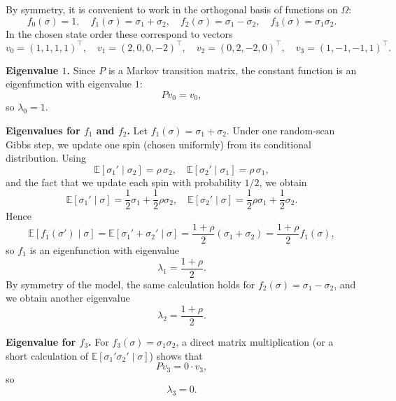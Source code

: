 \documentclass[answers,12pt,addpoints]{exam}
\begin{document}
\begin{enumerate}
\begin{solution}
By symmetry, it is convenient to work in the orthogonal basis of functions
on $\Omega$:
\[
f_0(\sigma) = 1,\quad
f_1(\sigma) = \sigma_1 + \sigma_2,\quad
f_2(\sigma) = \sigma_1 - \sigma_2,\quad
f_3(\sigma) = \sigma_1 \sigma_2.
\]
In the chosen state order these correspond to vectors
\[
v_0 = (1,1,1,1)^\top,\quad
v_1 = (2,0,0,-2)^\top,\quad
v_2 = (0,2,-2,0)^\top,\quad
v_3 = (1,-1,-1,1)^\top.
\]

\medskip
\noindent\textbf{Eigenvalue $1$.}
Since $P$ is a Markov transition matrix, the constant function is an
eigenfunction with eigenvalue $1$:
\[
P v_0 = v_0,
\]
so $\lambda_0 = 1$.

\medskip
\noindent\textbf{Eigenvalues for $f_1$ and $f_2$.}
Let $f_1(\sigma) = \sigma_1 + \sigma_2$. Under one random-scan Gibbs step,
we update one spin (chosen uniformly) from its conditional distribution.
Using
\[
\mathbb{E}[\sigma_1' \mid \sigma_2] = \rho\,\sigma_2,
\quad
\mathbb{E}[\sigma_2' \mid \sigma_1] = \rho\,\sigma_1,
\]
and the fact that we update each spin with probability $1/2$, we obtain
\[
\mathbb{E}[\sigma_1' \mid \sigma]
= \frac{1}{2}\sigma_1 + \frac{1}{2}\rho\sigma_2,
\quad
\mathbb{E}[\sigma_2' \mid \sigma]
= \frac{1}{2}\rho\sigma_1 + \frac{1}{2}\sigma_2.
\]
Hence
\[
\mathbb{E}[f_1(\sigma') \mid \sigma]
= \mathbb{E}[\sigma_1' + \sigma_2' \mid \sigma]
= \frac{1+\rho}{2}(\sigma_1 + \sigma_2)
= \frac{1+\rho}{2} f_1(\sigma),
\]
so $f_1$ is an eigenfunction with eigenvalue
\[
\lambda_1 = \frac{1+\rho}{2}.
\]
By symmetry of the model, the same calculation holds for
$f_2(\sigma) = \sigma_1 - \sigma_2$, and we obtain another eigenvalue
\[
\lambda_2 = \frac{1+\rho}{2}.
\]

\medskip
\noindent\textbf{Eigenvalue for $f_3$.}
For $f_3(\sigma) = \sigma_1\sigma_2$, a direct matrix multiplication
(or a short calculation of $\mathbb{E}[\sigma_1'\sigma_2' \mid \sigma]$)
shows that
\[
P v_3 = 0\cdot v_3,
\]
so
\[
\lambda_3 = 0.
\]


\end{solution}
\end{enumerate}
\end{document}
